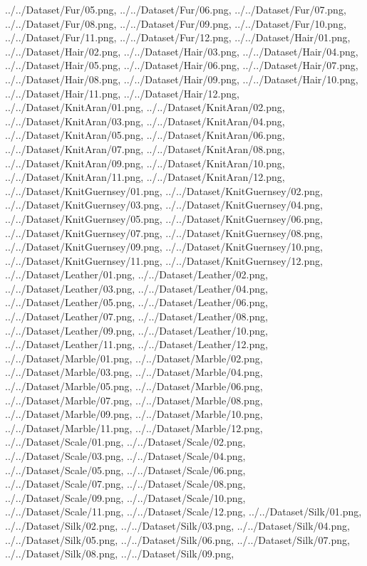 {../../Dataset/Fur/05.png,
../../Dataset/Fur/06.png,
../../Dataset/Fur/07.png,
../../Dataset/Fur/08.png,
../../Dataset/Fur/09.png,
../../Dataset/Fur/10.png,
../../Dataset/Fur/11.png,
../../Dataset/Fur/12.png,
../../Dataset/Hair/01.png,
../../Dataset/Hair/02.png,
../../Dataset/Hair/03.png,
../../Dataset/Hair/04.png,
../../Dataset/Hair/05.png,
../../Dataset/Hair/06.png,
../../Dataset/Hair/07.png,
../../Dataset/Hair/08.png,
../../Dataset/Hair/09.png,
../../Dataset/Hair/10.png,
../../Dataset/Hair/11.png,
../../Dataset/Hair/12.png,
../../Dataset/KnitAran/01.png,
../../Dataset/KnitAran/02.png,
../../Dataset/KnitAran/03.png,
../../Dataset/KnitAran/04.png,
../../Dataset/KnitAran/05.png,
../../Dataset/KnitAran/06.png,
../../Dataset/KnitAran/07.png,
../../Dataset/KnitAran/08.png,
../../Dataset/KnitAran/09.png,
../../Dataset/KnitAran/10.png,
../../Dataset/KnitAran/11.png,
../../Dataset/KnitAran/12.png,
../../Dataset/KnitGuernsey/01.png,
../../Dataset/KnitGuernsey/02.png,
../../Dataset/KnitGuernsey/03.png,
../../Dataset/KnitGuernsey/04.png,
../../Dataset/KnitGuernsey/05.png,
../../Dataset/KnitGuernsey/06.png,
../../Dataset/KnitGuernsey/07.png,
../../Dataset/KnitGuernsey/08.png,
../../Dataset/KnitGuernsey/09.png,
../../Dataset/KnitGuernsey/10.png,
../../Dataset/KnitGuernsey/11.png,
../../Dataset/KnitGuernsey/12.png,
../../Dataset/Leather/01.png,
../../Dataset/Leather/02.png,
../../Dataset/Leather/03.png,
../../Dataset/Leather/04.png,
../../Dataset/Leather/05.png,
../../Dataset/Leather/06.png,
../../Dataset/Leather/07.png,
../../Dataset/Leather/08.png,
../../Dataset/Leather/09.png,
../../Dataset/Leather/10.png,
../../Dataset/Leather/11.png,
../../Dataset/Leather/12.png,
../../Dataset/Marble/01.png,
../../Dataset/Marble/02.png,
../../Dataset/Marble/03.png,
../../Dataset/Marble/04.png,
../../Dataset/Marble/05.png,
../../Dataset/Marble/06.png,
../../Dataset/Marble/07.png,
../../Dataset/Marble/08.png,
../../Dataset/Marble/09.png,
../../Dataset/Marble/10.png,
../../Dataset/Marble/11.png,
../../Dataset/Marble/12.png,
../../Dataset/Scale/01.png,
../../Dataset/Scale/02.png,
../../Dataset/Scale/03.png,
../../Dataset/Scale/04.png,
../../Dataset/Scale/05.png,
../../Dataset/Scale/06.png,
../../Dataset/Scale/07.png,
../../Dataset/Scale/08.png,
../../Dataset/Scale/09.png,
../../Dataset/Scale/10.png,
../../Dataset/Scale/11.png,
../../Dataset/Scale/12.png,
../../Dataset/Silk/01.png,
../../Dataset/Silk/02.png,
../../Dataset/Silk/03.png,
../../Dataset/Silk/04.png,
../../Dataset/Silk/05.png,
../../Dataset/Silk/06.png,
../../Dataset/Silk/07.png,
../../Dataset/Silk/08.png,
../../Dataset/Silk/09.png,
}
